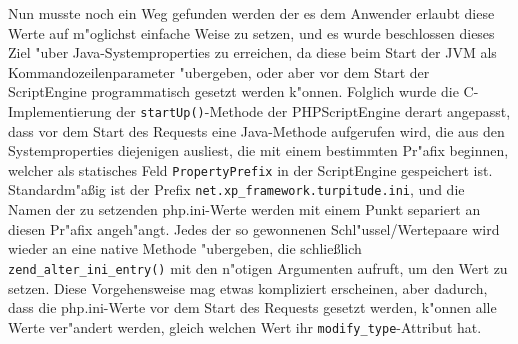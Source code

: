 Nun musste noch ein Weg gefunden werden der es dem Anwender erlaubt diese Werte auf m"oglichst einfache Weise zu setzen, und es wurde beschlossen dieses
Ziel "uber Java-Systemproperties zu erreichen, da diese beim Start der JVM als Kommandozeilenparameter "ubergeben, oder aber vor dem Start der ScriptEngine 
programmatisch gesetzt werden k"onnen. Folglich wurde die C-Implementierung der \texttt{startUp()}-Methode der PHPScriptEngine derart angepasst, dass vor dem 
Start des Requests eine Java-Methode aufgerufen wird, die aus den Systemproperties diejenigen ausliest,  die mit einem bestimmten Pr"afix beginnen, welcher 
als statisches Feld \texttt{PropertyPrefix} in der ScriptEngine gespeichert ist.
Standardm"a\ss ig ist der Prefix \texttt{net.xp\_framework.turpitude.ini}, und die Namen der zu setzenden php.ini-Werte werden mit einem Punkt separiert an diesen
Pr"afix angeh"angt. Jedes der so gewonnenen Schl"ussel/Wertepaare wird wieder an eine native Methode "ubergeben, die schlie\ss lich \texttt{zend\_alter\_ini\_entry()}
mit den n"otigen Argumenten aufruft, um den Wert zu setzen. Diese Vorgehensweise mag etwas kompliziert erscheinen, aber dadurch, dass die php.ini-Werte vor dem
Start des Requests gesetzt werden, k"onnen alle Werte ver"andert werden, gleich welchen Wert ihr \texttt{modify\_type}-Attribut hat.


